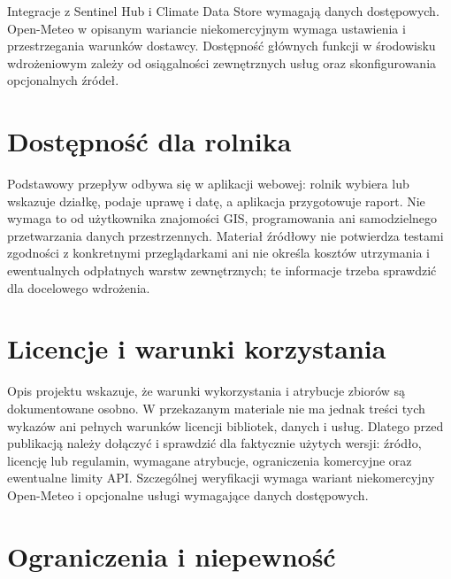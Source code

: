 \documentclass[11pt,a4paper]{article}
\newcommand{\code}[1]{\textcolor{PWField}{\texttt{\detokenize{#1}}}}
\begin{document}
Integracje z Sentinel Hub i Climate Data Store wymagają danych dostępowych. Open-Meteo w opisanym wariancie niekomercyjnym wymaga ustawienia \code{WODO_NONCOMMERCIAL_OPEN_METEO=1} i przestrzegania warunków dostawcy. Dostępność głównych funkcji w środowisku wdrożeniowym zależy od osiągalności zewnętrznych usług oraz skonfigurowania opcjonalnych źródeł.

\section{Dostępność dla rolnika}

Podstawowy przepływ odbywa się w aplikacji webowej: rolnik wybiera lub wskazuje działkę, podaje uprawę i datę, a aplikacja przygotowuje raport. Nie wymaga to od użytkownika znajomości GIS, programowania ani samodzielnego przetwarzania danych przestrzennych. Materiał źródłowy nie potwierdza testami zgodności z konkretnymi przeglądarkami ani nie określa kosztów utrzymania i ewentualnych odpłatnych warstw zewnętrznych; te informacje trzeba sprawdzić dla docelowego wdrożenia.

\section{Licencje i warunki korzystania}

Opis projektu wskazuje, że warunki wykorzystania i atrybucje zbiorów są dokumentowane osobno. W przekazanym materiale nie ma jednak treści tych wykazów ani pełnych warunków licencji bibliotek, danych i usług. Dlatego przed publikacją należy dołączyć i sprawdzić dla faktycznie użytych wersji: źródło, licencję lub regulamin, wymagane atrybucje, ograniczenia komercyjne oraz ewentualne limity API. Szczególnej weryfikacji wymaga wariant niekomercyjny Open-Meteo i opcjonalne usługi wymagające danych dostępowych.

\section{Ograniczenia i niepewność}
\end{document}
